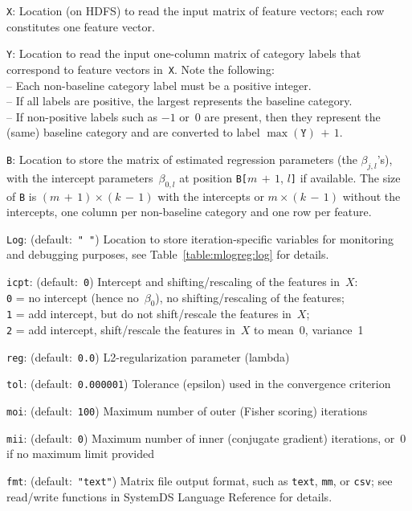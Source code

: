 \smallskip
{}
\begin{Description}
\item[{\tt X}:]
Location (on HDFS) to read the input matrix of feature vectors; each row constitutes
one feature vector.
\item[{\tt Y}:]
Location to read the input one-column matrix of category labels that correspond to
feature vectors in~{\tt X}.  Note the following:\\
-- Each non-baseline category label must be a positive integer.\\
-- If all labels are positive, the largest represents the baseline category.\\
-- If non-positive labels such as $-1$ or~$0$ are present, then they represent the (same)
baseline category and are converted to label $\max(\texttt{Y})\,{+}\,1$.
\item[{\tt B}:]
Location to store the matrix of estimated regression parameters (the $\beta_{j, l}$'s),
with the intercept parameters~$\beta_{0, l}$ at position {\tt B[}$m\,{+}\,1$, $l${\tt ]}
if available.  The size of {\tt B} is $(m\,{+}\,1)\times (k\,{-}\,1)$ with the intercepts
or $m \times (k\,{-}\,1)$ without the intercepts, one column per non-baseline category
and one row per feature.
\item[{\tt Log}:] (default:\mbox{ }{\tt " "})
Location to store iteration-specific variables for monitoring and debugging purposes,
see Table~\ref{table:mlogreg:log} for details.
\item[{\tt icpt}:] (default:\mbox{ }{\tt 0})
Intercept and shifting/rescaling of the features in~$X$:\\
{\tt 0} = no intercept (hence no~$\beta_0$), no shifting/rescaling of the features;\\
{\tt 1} = add intercept, but do not shift/rescale the features in~$X$;\\
{\tt 2} = add intercept, shift/rescale the features in~$X$ to mean~0, variance~1
\item[{\tt reg}:] (default:\mbox{ }{\tt 0.0})
L2-regularization parameter (lambda)
\item[{\tt tol}:] (default:\mbox{ }{\tt 0.000001})
Tolerance (epsilon) used in the convergence criterion
\item[{\tt moi}:] (default:\mbox{ }{\tt 100})
Maximum number of outer (Fisher scoring) iterations
\item[{\tt mii}:] (default:\mbox{ }{\tt 0})
Maximum number of inner (conjugate gradient) iterations, or~0 if no maximum
limit provided
\item[{\tt fmt}:] (default:\mbox{ }{\tt "text"})
Matrix file output format, such as {\tt text}, {\tt mm}, or {\tt csv};
see read/write functions in SystemDS Language Reference for details.
\end{Description}


